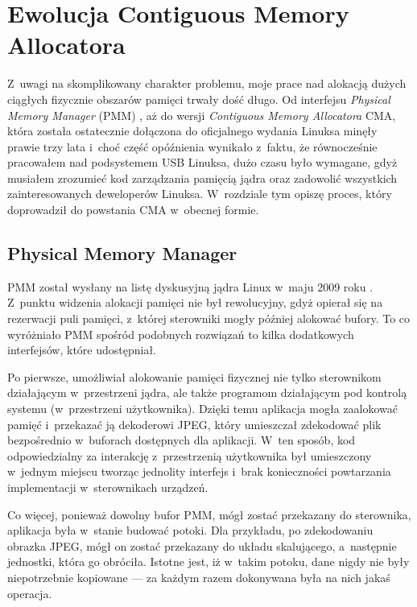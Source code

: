 \chapter{Ewolucja Contiguous Memory Allocatora}

Z~uwagi na skomplikowany charakter problemu, moje prace nad alokacją
dużych ciągłych fizycznie obszarów pamięci trwały dość długo.  Od
interfejsu \textit{Physical Memory Manager} (PMM)
\autocite{patch:pmm}, aż do wersji \textit{Contiguous Memory
  Allocatora} CMA, która została ostatecznie dołączona do oficjalnego
wydania Linuksa \autocite{patch:cma-24} minęły prawie trzy lata i~choć
część opóźnienia wynikało z~faktu, że równocześnie pracowałem nad
podsystemem USB Linuksa, dużo czasu było wymagane, gdyż musiałem
zrozumieć kod zarządzania pamięcią jądra oraz zadowolić wszystkich
zainteresowanych deweloperów Linuksa.  W~rozdziale tym opiszę proces,
który doprowadził do powstania CMA w~obecnej formie.


\section{Physical Memory Manager}\label{sec:evo-pmm}

PMM został wysłany na listę dyskusyjną jądra Linux w~maju 2009 roku
\autocite{patch:pmm}.  Z~punktu widzenia alokacji pamięci nie był
rewolucyjny, gdyż opierał się na rezerwacji puli pamięci, z~której
sterowniki mogły później alokować bufory.  To co wyróżniało PMM
spośród podobnych rozwiązań to kilka dodatkowych interfejsów, które
udostępniał.

Po pierwsze, umożliwiał alokowanie pamięci fizycznej nie tylko
sterownikom działającym w~przestrzeni jądra, ale także programom
działającym pod kontrolą systemu (w~przestrzeni użytkownika).  Dzięki
temu aplikacja mogła zaalokować pamięć i~przekazać ją dekoderowi JPEG,
który umieszczał zdekodować plik bezpośrednio w~buforach dostępnych
dla aplikacji. W~ten sposób, kod odpowiedzialny za interakcję
z~przestrzenią użytkownika był umieszczony w~jednym miejscu tworząc
jednolity interfejs i~brak konieczności powtarzania implementacji
w~sterownikach urządzeń.

Co więcej, ponieważ dowolny bufor PMM, mógł zostać przekazany do
sterownika, aplikacja była w~stanie budować potoki.  Dla przykładu, po
zdekodowaniu obrazka JPEG, mógł on zostać przekazany do układu
skalującego, a~następnie jednostki, która go obróciła.  Istotne jest,
iż w~takim potoku, dane nigdy nie były niepotrzebnie kopiowane --- za
każdym razem dokonywana była na nich jakaś operacja.

